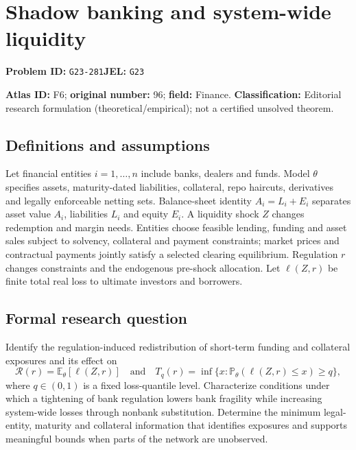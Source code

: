 \documentclass[11pt,a4paper]{article}
\begin{document}
\section*{Shadow banking and system-wide liquidity}
\textbf{Problem ID:} \texttt{G23-281}\quad \textbf{JEL:} \texttt{G23}\par
\label{problem:OP-0096}
\label{atlas:prob:F6}

\noindent\textbf{Atlas ID:} F6; \textbf{original number:} 96; \textbf{field:} Finance. \textbf{Classification:} Editorial research formulation (theoretical/empirical); not a certified unsolved theorem.

\subsection*{Definitions and assumptions}
Let financial entities $i=1,\ldots,n$ include banks, dealers and funds. Model $\theta$ specifies assets, maturity-dated liabilities, collateral, repo haircuts, derivatives and legally enforceable netting sets. Balance-sheet identity $A_i=L_i+E_i$ separates asset value $A_i$, liabilities $L_i$ and equity $E_i$. A liquidity shock $Z$ changes redemption and margin needs. Entities choose feasible lending, funding and asset sales subject to solvency, collateral and payment constraints; market prices and contractual payments jointly satisfy a selected clearing equilibrium. Regulation $r$ changes constraints and the endogenous pre-shock allocation. Let $\ell(Z,r)$ be finite total real loss to ultimate investors and borrowers.

\subsection*{Formal research question}
Identify the regulation-induced redistribution of short-term funding and collateral exposures and its effect on
\[
 \mathcal R(r)=\mathbb E_\theta[\ell(Z,r)]
 \quad\text{and}\quad
 T_q(r)=\inf\{x:\mathbb P_\theta(\ell(Z,r)\le x)\ge q\},
\]
where $q\in(0,1)$ is a fixed loss-quantile level. Characterize conditions under which a tightening of bank regulation lowers bank fragility while increasing system-wide losses through nonbank substitution. Determine the minimum legal-entity, maturity and collateral information that identifies exposures and supports meaningful bounds when parts of the network are unobserved.
\end{document}

